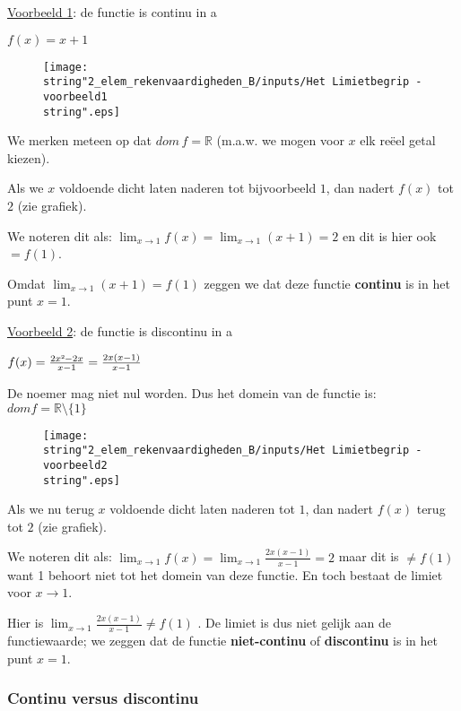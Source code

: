 \noindent \uline{Voorbeeld 1}: de functie is continu in a 

$f(x)=x+1$

\begin{figure}[h]
\centering{}\texttt{[image: \\string"2\_elem\_rekenvaardigheden\_B/inputs/Het Limietbegrip - voorbeeld1\\string".eps]} 
\end{figure}


We merken meteen op dat $dom\,f=\mathbb{R}$ (m.a.w. we mogen voor
$x$ elk re\"eel getal kiezen).

Als we $x$ voldoende dicht laten naderen tot bijvoorbeeld $1$, dan
nadert $f(x)$ tot $2$ (zie grafiek).

We noteren dit als: ${\displaystyle \lim_{x\to1}}f(x)={\displaystyle \lim_{x\to1}}(x+1)=2$
en dit is hier ook $=f(1)$.

Omdat ${\displaystyle \lim_{x\to1}}(x+1)=f(1)$ zeggen we dat deze
functie \textbf{continu} is in het punt $x=1$.

\medskip{}


\noindent \uline{Voorbeeld 2}: de functie is discontinu in a

$f(x)=\frac{2x\text{\texttwosuperior}-2x}{x-1}=\frac{2x(x-1)}{x-1}$

De noemer mag niet nul worden. Dus het domein van de functie is: $domf=\mathbb{R}\setminus\{1\}$

\begin{figure}[h]
\centering{}\texttt{[image: \\string"2\_elem\_rekenvaardigheden\_B/inputs/Het Limietbegrip - voorbeeld2\\string".eps]} 
\end{figure}


Als we nu terug $x$ voldoende dicht laten naderen tot $1$, dan nadert
$f(x)$ terug tot $2$ (zie grafiek).

We noteren dit als: ${\displaystyle \lim_{x\to1}}f(x)={\displaystyle \lim_{x\to1}}\frac{2x(x-1)}{x-1}=2$
maar dit is $\neq f(1)$ want 1 behoort niet tot het domein van deze
functie. En toch bestaat de limiet voor $x\rightarrow1$.

Hier is ${\displaystyle \lim_{x\to1}}\frac{2x(x-1)}{x-1}\neq f(1)$
. De limiet is dus niet gelijk aan de functiewaarde; we zeggen dat
de functie \textbf{niet-continu} of \textbf{discontinu} is in het
punt $x=1$.


\subsubsection{Continu versus discontinu}

